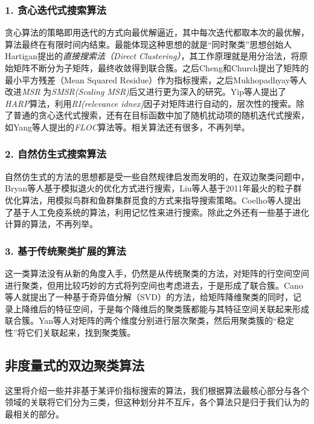 \subsubsection*{1. 贪心迭代式搜索算法}
贪心算法的策略即用迭代的方式向最优解逼近，其中每次迭代都取本次的最优解，算法最终在有限时间内结束。最能体现这种思想的就是“同时聚类”思想创始人Hartigan\cite{hartigan1972direct}提出的\emph{直接搜索法（Direct Clustering）}，其工作原理就是用分治法，将原始矩阵不断分为子矩阵，最终收敛得到联合簇。之后Cheng和Church\cite{cheng2000biclustering}提出了矩阵的最小平方残差（Mean Squared Residue）作为指标搜索，之后Mukhopadhyay等人\cite{mukhopadhyay2009novel}改进\emph{MSR} 为\emph{SMSR(Scaling MSR)}后又进行更为深入的研究。Yip等人\cite{yip2004harp}提出了\emph{HARP}算法，利用\emph{RI(relevance idnex)}因子对矩阵进行自动的，层次性的搜索。除了普通的贪心迭代式搜索，还有在目标函数中加了随机扰动项的随机迭代式搜索，如Yang等人\cite{yang2005improved}提出的\emph{FLOC}算法等。相关算法还有很多，不再列举。

\subsubsection*{2. 自然仿生式搜索算法}
自然仿生式的方法的思想都是受一些自然规律启发而发明的，在双边聚类问题中，Bryan等人\cite{bryan2006application}基于模拟退火\cite{das2005quantum}的优化方式进行搜索，Liu等人\cite{liu2009biclustering}基于2011年最火的粒子群优化算法\cite{kennedy2011particle}，用模拟鸟群和鱼群集群觅食的方式来指导搜索策略。Coelho等人\cite{coelho2009multi}提出了基于人工免疫系统\cite{de2002artificial}的算法，利用记忆性来进行搜索。除此之外还有一些基于进化计算的算法，不再列举。

\subsubsection*{3. 基于传统聚类扩展的算法}
这一类算法没有从新的角度入手，仍然是从传统聚类的方法，对矩阵的行空间空间进行聚类，但用比较巧妙的方式将列空间也考虑进去，于是形成了联合簇。Cano等人\cite{cano2007possibilistic}就提出了一种基于奇异值分解（SVD）的方法，给矩阵降维聚类的同时，记录上降维后的特征空间，于是每个降维后的聚类簇都能与其特征空间关联起来形成联合簇。Yan等人\cite{yang2011finding}对矩阵的两个维度分别进行层次聚类，然后用聚类簇的“稳定性”将它们关联起来，找到聚类簇。

\subsection{非度量式的双边聚类算法}
\label{nonsearch}
这里将介绍一些并非基于某评价指标搜索的算法，我们根据算法最核心部分与各个领域的关联将它们分为三类，但这种划分并不互斥，各个算法只是归于我们认为的最相关的部分。

